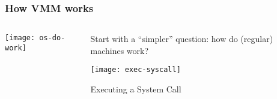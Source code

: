 \begin{frame}[plain]
	\frametitle{How VMM works }
	
	
	
	\begin{columns}
		
		\begin{column}{.3\textwidth}
			
			\texttt{[image: os-do-work]}
			
		\end{column}
		
		\begin{column}{.7\textwidth}
			
			Start with a “simpler” question:  how do (regular) machines work?	
			
			\centering
			\texttt{[image: exec-syscall]}	
			
			Executing a System Call
			
%				
			
		\end{column}
		
		
	\end{columns}
	
	
\end{frame}

